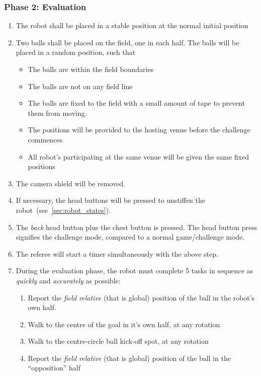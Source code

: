 \subsubsection{Phase 2: Evaluation}

\begin{enumerate}
    \item The robot shall be placed in a stable position at the normal initial position
    \item Two balls shall be placed on the field, one in each half. The balls will be placed in a random position, such that
    \begin{itemize}
        \item The balls are within the field boundaries
        \item The balls are not on any field line
        \item The balls are fixed to the field with a small amount of tape to prevent them from moving.
        \item The positions will be provided to the hosting venue before the challenge commences
        \item All robot's participating at the same venue will be given the same fixed positions
    \end{itemize}
    \item The camera shield will be removed.
    \item If necessary, the head buttons will be pressed to unstiffen the robot~(see~\ref{sec:robot_states}).
    \item The \textit{back} head button plus the chest button is pressed. The head button press signifies the challenge mode, compared to a normal game/challenge mode.
    \item The referee will start a timer simultaneously with the above step.
    \item During the evaluation phase, the robot must complete 5 tasks in sequence as \textit{quickly} and \textit{accurately} as possible:
    \begin{enumerate}
        \item Report the \textit{field relative} (that is global) position of the ball in the robot's own half.
        \item Walk to the centre of the goal in it's own half, at any rotation
        \item Walk to the centre-circle ball kick-off spot, at any rotation
        \item Report the \textit{field relative} (that is global) position of the ball in the ``opposition'' half

\end{enumerate}
\end{enumerate}
